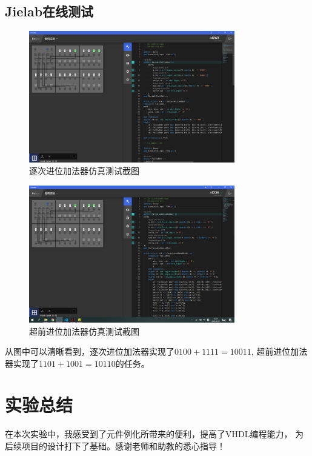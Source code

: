 \documentclass[UTF8]{article}
\begin{document}
\clearpage
\subsection{Jielab在线测试}
\begin{figure}[h]
    \label{md}
    \centering
        \includegraphics[width=0.8\textwidth]{ZC.png}
        \caption{逐次进位加法器仿真测试截图}
    \end{figure}

\begin{figure}[h]
    \label{md}
    \centering
        \includegraphics[width=0.8\textwidth]{CQ.png}
        \caption{超前进位加法器仿真测试截图}
    \end{figure}
从图中可以清晰看到，逐次进位加法器实现了$0100+1111=10011$, 超前进位加法器实现了$1101+1001=10110$的任务。

\clearpage

\section{实验总结}
在本次实验中，我感受到了元件例化所带来的便利，提高了VHDL编程能力，
为后续项目的设计打下了基础。感谢老师和助教的悉心指导！



\end{document}
